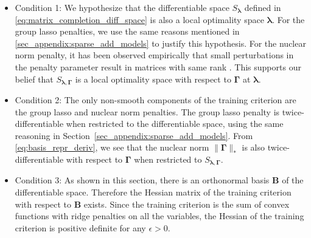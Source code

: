 \documentclass[12pt,letterpaper]{article}
\begin{document}
\begin{itemize}
	\item[] Condition 1: We hypothesize that the differentiable space $S_{\boldsymbol{\lambda}}$ defined in \eqref{eq:matrix_completion_diff_space} is also a local optimality space $\boldsymbol{\lambda}$. For the group lasso penalties, we use the same reasons mentioned in \ref{sec_appendix:sparse_add_models} to justify this hypothesis. For the nuclear norm penalty, it has been observed empirically that small perturbations in the penalty parameter result in matrices with same rank \citep{mazumder2010spectral}. This supports our belief that $S_{\boldsymbol{\lambda}, \boldsymbol{\Gamma}}$ is a local optimality space with respect to $\boldsymbol{\Gamma}$ at $\boldsymbol{\lambda}$.
	\item[] Condition 2: The only non-smooth components of the training criterion are the group lasso and nuclear norm penalties. The group lasso penalty is twice-differentiable when restricted to the differentiable space, using the same reasoning in Section~\ref{sec_appendix:sparse_add_models}. From \eqref{eq:basis_repr_deriv}, we see that the nuclear norm $\|\boldsymbol{\Gamma}\|_{*}$ is also twice-differentiable with respect to $\boldsymbol{\Gamma}$ when restricted to $S_{\boldsymbol{\lambda}, \boldsymbol{\Gamma}}$.
	\hfill {}
	\item[] Condition 3: As shown in this section, there is an orthonormal basis $\boldsymbol{B}$ of the differentiable space. Therefore the Hessian matrix of the training criterion with respect to $\boldsymbol{B}$ exists. Since the training criterion is the sum of convex functions with ridge penalties on all the variables, the Hessian of the training criterion is positive definite for any $\epsilon > 0$.
	\hfill {}
\end{itemize}
\end{document}
